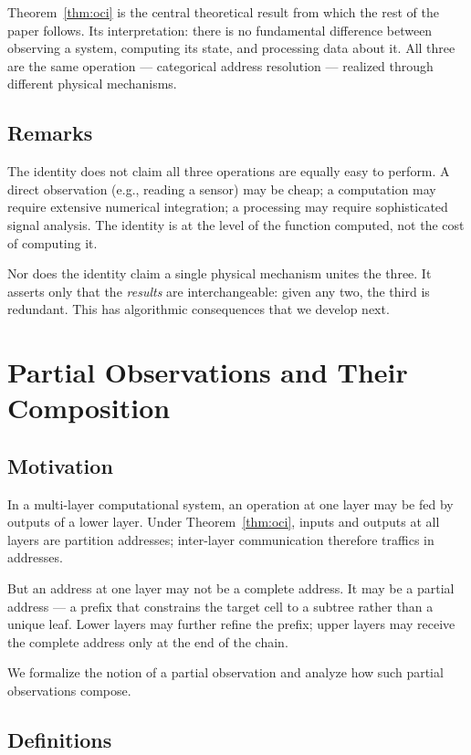\documentclass[11pt,a4paper]{article}
\theoremstyle{definition}
\theoremstyle{remark}
\begin{document}
Theorem~\ref{thm:oci} is the central theoretical result from which the rest of the paper follows. Its interpretation: there is no fundamental difference between observing a system, computing its state, and processing data about it. All three are the same operation --- categorical address resolution --- realized through different physical mechanisms.

\subsection{Remarks}

The identity does not claim all three operations are equally easy to perform. A direct observation (e.g., reading a sensor) may be cheap; a computation may require extensive numerical integration; a processing may require sophisticated signal analysis. The identity is at the level of the function computed, not the cost of computing it.

Nor does the identity claim a single physical mechanism unites the three. It asserts only that the \emph{results} are interchangeable: given any two, the third is redundant. This has algorithmic consequences that we develop next.

\section{Partial Observations and Their Composition}
\label{sec:partial}

\subsection{Motivation}

In a multi-layer computational system, an operation at one layer may be fed by outputs of a lower layer. Under Theorem~\ref{thm:oci}, inputs and outputs at all layers are partition addresses; inter-layer communication therefore traffics in addresses.

But an address at one layer may not be a complete address. It may be a partial address --- a prefix that constrains the target cell to a subtree rather than a unique leaf. Lower layers may further refine the prefix; upper layers may receive the complete address only at the end of the chain.

We formalize the notion of a partial observation and analyze how such partial observations compose.

\subsection{Definitions}
\end{document}
